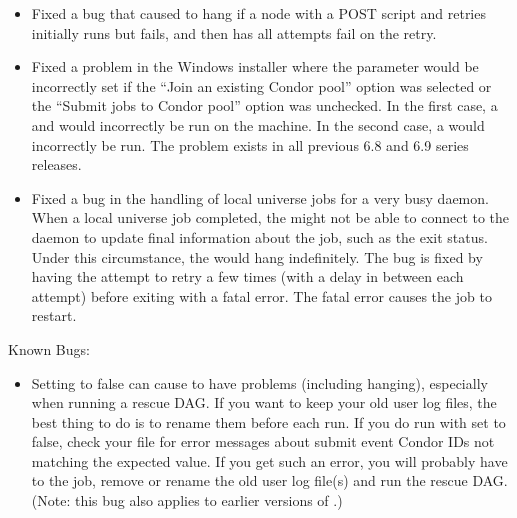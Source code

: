 \begin{itemize}
\item Fixed a bug that caused  to hang if a node
with a POST script and retries initially runs but fails, and then
has all  attempts fail on the retry.

\item Fixed a problem in the Windows installer where the
 parameter would be incorrectly set if the ``Join
an existing Condor pool'' option was selected or the ``Submit jobs to
Condor pool'' option was unchecked.  In the first case, a
 and  would incorrectly be run on
the machine. In the second case, a  would incorrectly
be run. The problem exists in all previous 6.8 and 6.9 series
releases.

\item Fixed a bug in the handling of local universe jobs
for a very busy  daemon.
When a local universe job completed, the  might not
be able to connect to the  daemon to update final information
about the job, such as the exit status.
Under this circumstance,
the  would hang indefinitely.
The bug is fixed by having the  attempt
to retry a few times (with a delay in between each attempt) before
exiting with a fatal error.
The fatal error causes the job to restart.

\end{itemize}

\noindent Known Bugs:

\begin{itemize}

\item Setting  to false can cause
 to have problems (including hanging), especially
when running a rescue DAG.  If you want to keep your old user log
files, the best thing to do is to rename them before each
 run.  If you do run with
 set to false, check your
 file for error messages about submit event
Condor IDs not matching the expected value.  If you get such an
error, you will probably have to  the 
job, remove or rename the old user log file(s) and run the rescue DAG.
(Note: this bug also applies to earlier versions of .)

\end{itemize}




